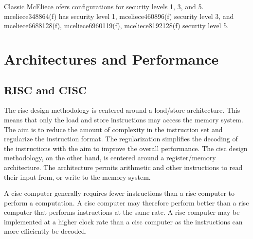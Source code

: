 Classic McEliece ofers configurations for security levels 1, 3, and 5. mceliece348864(f) has security level 1, mceliece460896(f) security level 3, and mceliece6688128(f), mceliece6960119(f), mceliece8192128(f) security level 5.



\section{Architectures and Performance}


\subsection{RISC and CISC}

The \acrfull{risc} design methodology is centered around a load/store architecture\cite{flynn1998}. This means that only the load and store instructions may access the memory system\cite{carter2002}. The aim is to reduce the amount of complexity in the instruction set and regularize the instruction format. The regularization simplifies the decoding of the instructions with the aim to improve the overall performance\cite{flynn1998}. The \acrfull{cisc} design methodology, on the other hand, is centered around a register/memory architecture\cite{flynn1998}. The architecture permits arithmetic and other instructions to read their input from, or write to the memory system\cite{carter2002}.

A \gls{cisc} computer generally requires fewer instructions than a \gls{risc} computer to perform a computation. A \gls{cisc} computer may therefore perform better than a \gls{risc} computer that performs instructions at the same rate. A \gls{risc} computer may be implemented at a higher clock rate than a \gls{cisc} computer as the instructions can more efficiently be decoded\cite{carter2002}.

